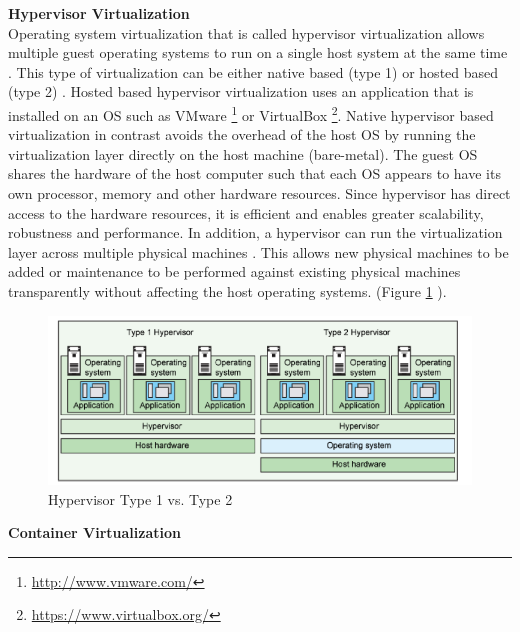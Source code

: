 \documentclass[a4paper,11pt,twoside]{article}
\begin{document}
\noindent
\textbf{Hypervisor Virtualization}\\
\noindent
Operating system virtualization that is called hypervisor virtualization allows multiple guest operating systems to run on a single host system at the same time \cite{Hypervisors2}. This type of virtualization can be either native based (type 1) or hosted based (type 2) \cite{Hypervisors}. Hosted based hypervisor virtualization uses an application that is installed on an OS such as VMware \footnote{\url{http://www.vmware.com/}} or VirtualBox \footnote{\url {https://www.virtualbox.org/}}. Native hypervisor based virtualization in contrast avoids the overhead of the host OS by running the virtualization layer directly on the host machine (bare-metal). The guest OS shares the hardware of the host computer such that each OS appears to have its own processor, memory and other hardware resources. Since hypervisor has direct access to the hardware resources, it is efficient and enables greater scalability, robustness and performance. In addition, a hypervisor can run the virtualization layer across multiple physical machines \cite{Hypervisors}. This allows new physical machines to be added or maintenance to be performed against existing physical machines transparently without affecting the host operating systems. (Figure \ref{Hypervisor} ).\\


\begin{figure}[!ht]
  \centering
     \includegraphics[scale=1]{Hypervisor}
  \caption{Hypervisor Type 1 vs. Type 2 \cite{Hypervisors}}
  \label{Hypervisor}
\end{figure}

\noindent
\textbf{Container Virtualization} 
\end{document}
